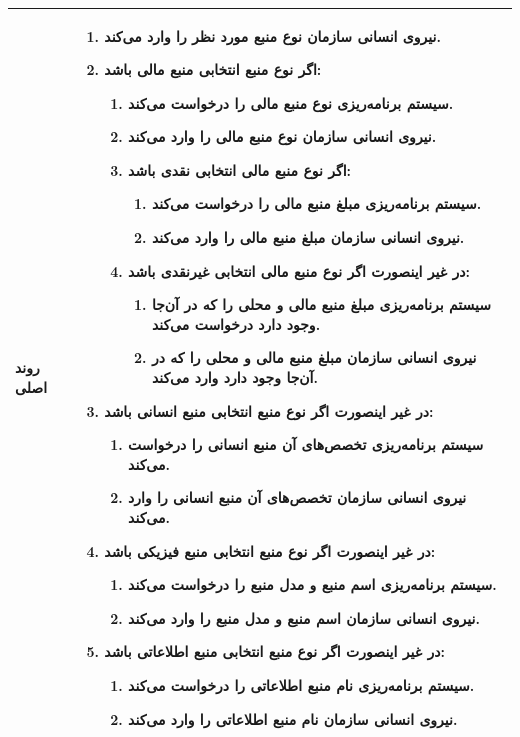 \begin{table}[H]
\begin{tabular}{|p{3cm}|p{10cm}|}
		
		روند اصلی &
		\begin{enumerate}[topsep=0cm,leftmargin=0.5cm]
			\item نیروی انسانی سازمان نوع منبع مورد نظر را وارد می‌کند. 
			\item اگر نوع منبع انتخابی منبع مالی باشد:
			\begin{enumerate}[topsep=0cm,leftmargin=0.5cm]
				\item سیستم برنامه‌ریزی نوع منبع مالی را درخواست می‌کند.
				\item نیروی انسانی سازمان نوع منبع مالی را وارد می‌کند.
				\item اگر نوع منبع مالی انتخابی نقدی باشد:
				\begin{enumerate}[topsep=0cm,leftmargin=0.5cm]
					\item سیستم برنامه‌ریزی مبلغ منبع مالی را درخواست می‌کند.
					\item نیروی انسانی سازمان مبلغ منبع مالی را وارد می‌کند.
				\end{enumerate}
				\item در غیر اینصورت اگر نوع منبع مالی انتخابی غیرنقدی باشد:
				\begin{enumerate}[topsep=0cm,leftmargin=0.5cm]
					\item سیستم برنامه‌ریزی مبلغ منبع مالی و محلی را که در آن‌جا وجود دارد درخواست می‌کند.
					\item نیروی انسانی سازمان مبلغ منبع مالی و محلی را که در آن‌جا وجود دارد وارد می‌کند.
				\end{enumerate}	
			\end{enumerate}
			\item در غیر اینصورت اگر نوع منبع انتخابی منبع انسانی باشد:
			\begin{enumerate}[topsep=0cm,leftmargin=0.5cm]
				\item  سیستم برنامه‌ریزی تخصص‌های آن منبع انسانی را درخواست می‌کند.
				\item  نیروی انسانی سازمان تخصص‌های آن منبع انسانی را وارد می‌کند.
			\end{enumerate}
			\item در غیر اینصورت اگر نوع منبع انتخابی منبع فیزیکی باشد:
			\begin{enumerate}[topsep=0cm,leftmargin=0.5cm]
				\item  سیستم برنامه‌ریزی اسم منبع و مدل منبع را درخواست می‌کند.
				\item نیروی انسانی سازمان اسم منبع و مدل منبع را وارد می‌کند.
			\end{enumerate}
			\item در غیر اینصورت اگر نوع منبع انتخابی منبع اطلاعاتی باشد:
			\begin{enumerate}[topsep=0cm,leftmargin=0.5cm]
				\item  سیستم برنامه‌ریزی نام منبع اطلاعاتی را درخواست می‌کند.
				\item  نیروی انسانی سازمان نام منبع اطلاعاتی را وارد می‌کند.
			\end{enumerate}
		\end{enumerate} \\
		\hline
		

\end{tabular}
\end{table}
